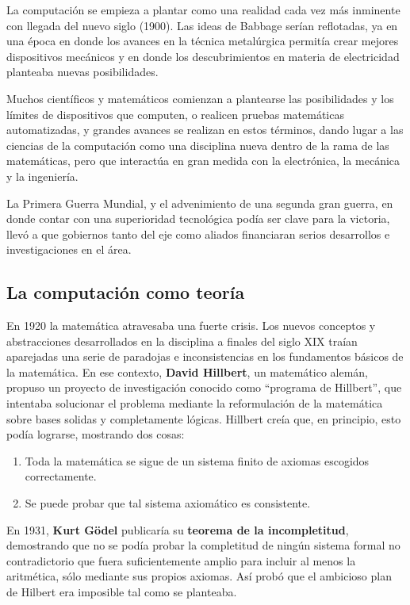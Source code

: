 La computación se empieza a plantar como una realidad cada vez más inminente con
llegada del nuevo siglo (1900). Las ideas de Babbage serían reflotadas, ya en
una época en donde los avances en la técnica metalúrgica permitía crear mejores
dispositivos mecánicos y en donde los descubrimientos en materia de electricidad
planteaba nuevas posibilidades.

Muchos científicos y matemáticos comienzan a plantearse las posibilidades y los
límites de dispositivos que computen, o realicen pruebas matemáticas
automatizadas, y grandes avances se realizan en estos términos, dando lugar a
las ciencias de la computación como una disciplina nueva dentro de la rama de
las matemáticas, pero que interactúa en gran medida con la electrónica, la
mecánica y la ingeniería.

La Primera Guerra Mundial, y el advenimiento de una segunda gran guerra, en
donde contar con una superioridad tecnológica podía ser clave para la victoria,
llevó a que gobiernos tanto del eje como aliados financiaran serios desarrollos
e investigaciones en el área.

\subsection{La computación como teoría}
\label{chap:historia_computadoras:subsec:teoria_computacion}

En 1920 la matemática atravesaba una fuerte crisis. Los nuevos conceptos y
abstracciones desarrollados en la disciplina a finales del siglo XIX traían
aparejadas una serie de paradojas e inconsistencias en los fundamentos básicos
de la matemática. En ese contexto, \textbf{David Hillbert}, un matemático
alemán, propuso un proyecto de investigación conocido como ``programa de
Hillbert'', que intentaba solucionar el problema mediante la reformulación de la
matemática sobre bases solidas y completamente lógicas. Hillbert creía que, en
principio, esto podía lograrse, mostrando dos cosas:
\begin{enumerate}
    \item Toda la matemática se sigue de un sistema finito de axiomas escogidos
    correctamente.
    \item Se puede probar que tal sistema axiomático es consistente.
\end{enumerate}

 En 1931,
\textbf{Kurt Gödel} publicaría su \textbf{teorema de la incompletitud},
demostrando que no se podía probar la completitud de ningún sistema formal no
contradictorio que fuera suficientemente amplio para incluir al menos la
aritmética, sólo mediante sus propios axiomas. Así probó que el ambicioso plan
de Hilbert era imposible tal como se planteaba.\autocite[cap. 3]{petzold_2008}

